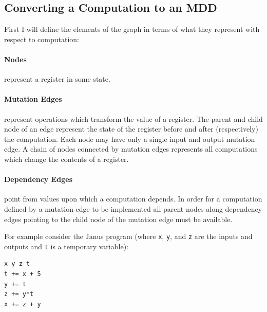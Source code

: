 \subsection{Converting a Computation to an MDD}

First I will define the elements of the graph in terms of what they represent
with respect to computation:

\paragraph{Nodes} represent a register in some state.

\paragraph{Mutation Edges} represent operations which transform the value
of a register. The parent and child node of an edge represent the state of the
register before and after (respectively) the computation. Each node may have
only a single input and output mutation edge. A chain of nodes connected by
mutation edges represents all computations which change the contents of a
register.

\paragraph{Dependency Edges} point from values upon which a computation
depends. In order for a computation defined by a mutation edge to be implemented
all parent nodes along dependency edges pointing to the child node of the
mutation edge must be available.


For example consider the Janus program (where \verb|x|, \verb|y|, and \verb|z|
are the inputs and outputs and \verb|t| is a temporary variable):

\begin{verbatim}
x y z t
t += x + 5
y += t
z += y*t
x += z + y
\end{verbatim}




